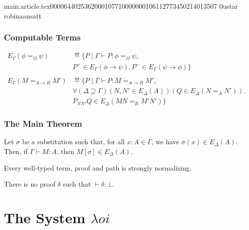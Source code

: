 main.article.tex                                                                                    0000644 0253620 0010771 00000001061 12773450214 013507  0                                                                                                    ustar   robina                          ansatt                                                                                                                                                                                                                 \documentclass{article}
\begin{document}
\begin{frame}
\frametitle{Computable Terms}
\begin{align*}
E_\Gamma(\phi =_\Omega \psi) & \eqdef \{ P \mid \Gamma \vdash P : \phi =_\Omega \psi, \\
& P^+ \in E_\Gamma(\phi \rightarrow \psi), P^- \in E_\Gamma(\psi \rightarrow \phi) \} \\
\\
E_\Gamma(M =_{A \rightarrow B} M') & \eqdef \{ P \mid \Gamma \vdash P : M =_{A \rightarrow B} M', \\
& \forall (\Delta \supseteq \Gamma) (N, N' \in E_\Delta(A)) (Q \in E_\Delta(N =_A N')). \\
& P_{NN'}Q \in E_\Delta(MN =_B M'N') \}
\end{align*}
\end{frame}

\begin{frame}
\frametitle{The Main Theorem}

\begin{theorem}
Let $\sigma$ be a substitution such that, for all $x : A \in \Gamma$, we have $\sigma(x) \in E_\Delta(A)$.
Then, if $\Gamma \vdash M : A$, then $M [ \sigma ] \in E_\Delta(A)$.
\end{theorem}

\small{
}

\begin{corollary}
Every well-typed term, proof and path is strongly normalizing.
\end{corollary}

\small{
}

\begin{corollary}[Consistency]
There is no proof $\delta$ such that $\vdash \delta : \bot$.
\end{corollary}
\end{frame}

\section{The System $\lambda o i$}
\end{document}
